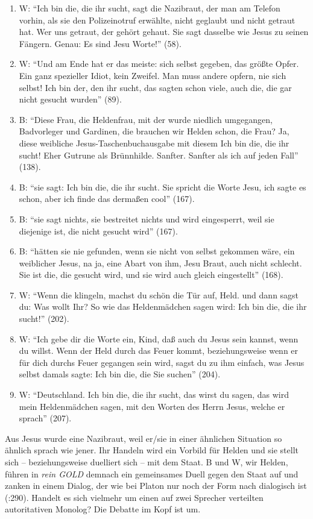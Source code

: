 \documentclass[fontsize=12pt]{scrartcl}
\begin{document}
\singlespacing
\begin{enumerate}
\item W: "`Ich bin die, die ihr sucht, sagt die Nazibraut, der man am Telefon vorhin, als sie den Polizeinotruf erw\"ahlte, nicht geglaubt und nicht getraut hat. Wer uns getraut, der geh\"ort gehaut. Sie sagt dasselbe wie Jesus zu seinen F\"angern. Genau: Es sind Jesu Worte!"' (58).
\item W: "`Und am Ende hat er das meiste: sich \mbox{selbst} gegeben, das gr\"o{\ss}te Opfer. Ein ganz spezieller Idiot, kein Zweifel. Man muss andere opfern, nie sich \mbox{selbst}! Ich bin der, den ihr sucht, das sagten schon viele, auch die, die gar nicht gesucht wurden"' (89).
\item B: "`Diese Frau, die Heldenfrau, mit der wurde niedlich umgegangen, Badvorleger und Gardinen, die brauchen wir Helden schon, die Frau? Ja, diese weibliche Jesus-Taschenbuchausgabe mit diesem \flq Ich bin die, die ihr sucht!\frq \,\,Eher Gutrune als Br\"unnhilde. Sanfter. Sanfter als ich auf jeden Fall"' (138). 
\item B: "`sie sagt: Ich bin die, die ihr sucht. Sie spricht die Worte Jesu, ich sagte es schon, aber ich finde das derma{\ss}en cool"' (167). 
\item B: "`sie sagt nichts, sie bestreitet nichts und wird eingesperrt, weil sie diejenige ist, die nicht gesucht wird"' (167).
\item B: "`h\"atten sie nie gefunden, wenn sie nicht von \mbox{selbst} gekommen w\"are, ein weiblicher Jesus, na ja, eine Abart von ihm, Jesu Braut, auch nicht schlecht. Sie ist die, die gesucht wird, und sie wird auch gleich eingestellt"' (168).
\item W: "`Wenn die klingeln, machst du sch\"on die T\"ur auf, Held. und dann sagst du: Was wollt Ihr? So wie das Heldenm\"adchen sagen wird: Ich bin die, die ihr sucht!"' (202).
\item W: "`Ich gebe dir die Worte ein, Kind, da{\ss} auch du Jesus sein kannst, wenn du willst. Wenn der Held durch das Feuer kommt, beziehungsweise wenn er f\"ur dich durchs Feuer gegangen sein wird, sagst du zu ihm einfach, was Jesus \mbox{selbst} damals sagte: Ich bin die, die Sie suchen"' (204).
\item W: "`Deutschland. Ich bin die, die ihr sucht, das wirst du sagen, das wird mein Heldenm\"adchen sagen, mit den Worten des Herrn Jesus, welche er sprach"' (207).
\end{enumerate}
\onehalfspacing

Aus Jesus wurde eine Nazibraut, weil er/sie in einer \"ahnlichen Situation so \"ahnlich sprach wie jener. Ihr Handeln wird ein Vorbild f\"ur Helden und sie stellt sich -- beziehungsweise duelliert sich -- mit dem Staat. B und W, wir Helden, f\"uhren in \textit{rein GOLD} demnach ein gemeinsames Duell gegen den Staat auf und zanken in einem Dialog, der wie bei Platon nur noch der Form nach dialogisch ist (\cite{SeyboldUngern-Sternberg2011}:290). Handelt es sich vielmehr um einen auf zwei Sprecher\textsuperscript{\tiny *} verteilten autoritativen Monolog? Die Debatte im Kopf ist um.
\end{document}
